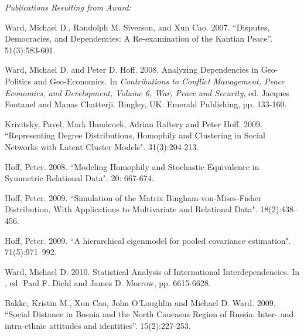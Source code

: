 \documentclass[pdftex,12pt,fullpage,oneside]{amsart}
\begin{document}
\textit{Publications Resulting from Award:}

\begin{list}{}{\leftmargin=1em} \small
\item Ward, Michael D., Randolph M. Siverson, and Xun Cao. 2007. ``Disputes, Democracies, and Dependencies: A Re-examination of the
  Kantian Peace''.  51(3):583-601.

\item Ward, Michael D. and Peter D. Hoff. 2008. Analyzing
  Dependencies in Geo-Politics and Geo-Economics.  \newblock In \textit{ Contributions to
    Conflict Management, Peace Economics, and Development, Volume 6,
    War, Peace and Security}, ed. Jacques Fontanel and Manas Chatterji. Bingley, UK: Emerald Publishing, pp. 133-160. %

\item Krivitsky, Pavel, Mark Handcock, Adrian Raftery and Peter Hoff. 2009. ``Representing Degree Distributions, Homophily and Clustering in
  Social Networks with Latent Cluster Models".  31(3):204-213.

\item  Hoff, Peter. 2008. ``Modeling Homophily and Stochastic Equivalence in
  Symmetric Relational Data".  20: 667-674.

\item Hoff, Peter. 2009. ``Simulation of the Matrix Bingham-von-Mises-Fisher
  Distribution, With Applications to Multivariate and Relational
  Data".  18(2):438--456.

\item Hoff, Peter. 2009. ``A hierarchical eigenmodel for pooled covariance
  estimation".  71(5):971--992.
  
\item Ward, Michael D. 2010. Statistical Analysis of
  International Interdependencies. In , ed. Paul F. Diehl and
  James D. Morrow, pp. 6615-6628.
  
\item Bakke, Kristin M., Xun Cao, John O'Loughlin and Michael D. Ward. 2009. ``Social Distance in Bosnia and the North Caucasus Region
  of Russia: Inter- and intra-ethnic attitudes and identities''.  15(2):227-253.


\end{list}
\end{document}
